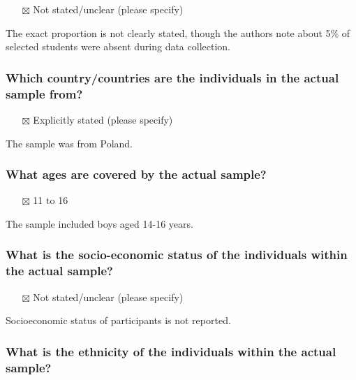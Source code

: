 \documentclass[
  doc, a4paper]{apa7}
\providecommand{\tightlist}{%
  \setlength{\itemsep}{0pt}\setlength{\parskip}{0pt}}
\begin{document}
\begin{itemize}
\tightlist
\item[$\boxtimes$]
  Not stated/unclear (please specify)
\end{itemize}

The exact proportion is not clearly stated, though the authors note about 5\% of selected students were absent during data collection.

\subsubsection{Which country/countries are the individuals in the actual sample from?}\label{which-countrycountries-are-the-individuals-in-the-actual-sample-from}

\begin{itemize}
\tightlist
\item[$\boxtimes$]
  Explicitly stated (please specify)
\end{itemize}

The sample was from Poland.

\subsubsection{What ages are covered by the actual sample?}\label{what-ages-are-covered-by-the-actual-sample}

\begin{itemize}
\tightlist
\item[$\boxtimes$]
  11 to 16
\end{itemize}

The sample included boys aged 14-16 years.

\subsubsection{What is the socio-economic status of the individuals within the actual sample?}\label{what-is-the-socio-economic-status-of-the-individuals-within-the-actual-sample}

\begin{itemize}
\tightlist
\item[$\boxtimes$]
  Not stated/unclear (please specify)
\end{itemize}

Socioeconomic status of participants is not reported.

\subsubsection{What is the ethnicity of the individuals within the actual sample?}\label{what-is-the-ethnicity-of-the-individuals-within-the-actual-sample}
\end{document}
